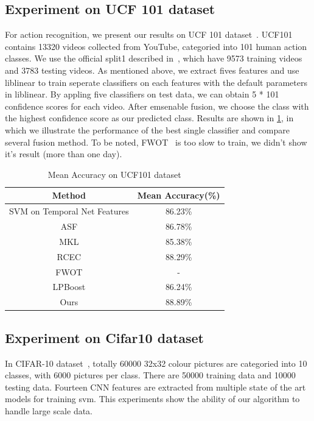 \documentclass[letterpaper]{article}
\begin{document}
\subsection{Experiment on UCF 101 dataset}
For action recognition, we present our results on UCF 101 dataset~\cite{soomro2012ucf101}. UCF101 contains 13320 videos collected from YouTube, categoried into 101 human action classes. We use the official split1 described in~\cite{soomro2012ucf101}, which have 9573 training videos and 3783 testing videos. As mentioned above, we extract fives features and use liblinear to train seperate classifiers on each features with the default parameters in liblinear. 
By appling five classifiers on test data, we can obtain 5 * 101 confidence scores for each video. After emsenable fusion, we choose the class with the highest confidence score as our predicted class. Results are shown in \ref{table:ucf101}, in which we illustrate the performance of the best single classifier and compare several fusion method. To be noted, FWOT~\cite{xuiccv2013feature} is too slow to train, we didn't show it's result (more than one day).

\begin{table}[h]\small
\centering
\label{table:ucf101}
\begin{tabular}{c|c}
\hline
Method                       & Mean Accuracy(\%) \\\hline
SVM on Temporal Net Features & 86.23\%           \\\hline
ASF                          & 86.78\%           \\
MKL                          & 85.38\%           \\
RCEC                         & 88.29\%           \\
FWOT                         & -                 \\
LPBoost                      & 86.24\%           \\\hline
Ours                         & 88.89\%           \\
\hline
\end{tabular}
\caption{Mean Accuracy on UCF101 dataset}
\end{table}


\subsection{Experiment on Cifar10 dataset}
In CIFAR-10 dataset~\cite{krizhevsky2009learning}, totally 60000 32x32 colour pictures are categoried into 10 classes, with 6000 pictures per class. There are 50000 training data and 10000 testing data. Fourteen CNN features are extracted from multiple state of the art models for training svm. This experiments show the ability of our algorithm to handle large scale data.
\end{document}
